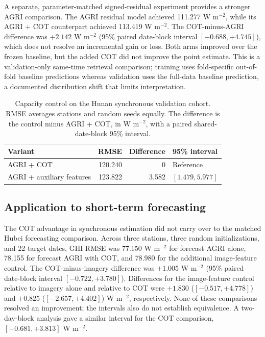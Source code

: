 \documentclass[11pt]{article}
\begin{document}
A separate, parameter-matched signed-residual experiment provides a stronger AGRI comparison. The AGRI residual model achieved 111.277 W m$^{-2}$, while its AGRI + COT counterpart achieved 113.419 W m$^{-2}$. The COT-minus-AGRI difference was $+2.142$ W m$^{-2}$ (95\% paired date-block interval $[-0.688,+4.745]$), which does not resolve an incremental gain or loss. Both arms improved over the frozen baseline, but the added COT did not improve the point estimate. This is a validation-only same-time retrieval comparison; training uses fold-specific out-of-fold baseline predictions whereas validation uses the full-data baseline prediction, a documented distribution shift that limits interpretation.
\begin{table}[!htbp]\centering\small
\caption{Capacity control on the Hunan synchronous validation cohort. RMSE averages stations and random seeds equally. The difference is the control minus AGRI + COT, in W m$^{-2}$, with a paired shared-date-block 95\% interval.}\label{tab:controls}
\begin{tabularx}{\linewidth}{Xrrl}\toprule
Variant & RMSE & Difference & 95\% interval\\\midrule
AGRI + COT & 120.240 & 0 & Reference\\
AGRI + auxiliary features & 123.822 & 3.582 & $[1.479,5.977]$\\
\bottomrule
\end{tabularx}\end{table}

\subsection{Application to short-term forecasting}
The COT advantage in synchronous estimation did not carry over to the matched Hubei forecasting comparison. Across three stations, three random initializations, and 22 target dates, GHI RMSE was 77.150 W m$^{-2}$ for forecast AGRI alone, 78.155 for forecast AGRI with COT, and 78.980 for the additional image-feature control. The COT-minus-imagery difference was $+1.005$ W m$^{-2}$ (95\% paired date-block interval $[-0.722,+3.780]$). Differences for the image-feature control relative to imagery alone and relative to COT were $+1.830$ ($[-0.517,+4.778]$) and $+0.825$ ($[-2.657,+4.402]$) W m$^{-2}$, respectively. None of these comparisons resolved an improvement; the intervals also do not establish equivalence. A two-day-block analysis gave a similar interval for the COT comparison, $[-0.681,+3.813]$ W m$^{-2}$.
\end{document}
